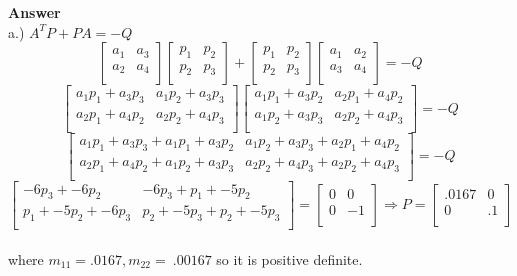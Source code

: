 \documentclass{homeworg}
\newcommand{\transpose}[1]{\ensuremath{#1^{\scriptscriptstyle T}}}
\begin{document}
\noindent
\textbf{Answer} \\
a.) \(\transpose{A}P+PA=-Q \)
\begin{equation*}
\begin{bmatrix}
    a_1 & a_3\\
    a_2 & a_4\\
\end{bmatrix}
\begin{bmatrix}
  p_1 & p_2\\
  p_2 & p_3\\
\end{bmatrix} +
\begin{bmatrix}
p_1 & p_2\\
p_2 & p_3\\
\end{bmatrix}
\begin{bmatrix}
  a_1 & a_2\\
  a_3 & a_4\\
\end{bmatrix} = -Q
\end{equation*}
\begin{equation*}
\begin{bmatrix}
  a_1 p_1 + a_3 p_3 & a_1 p_2 + a_3 p_3 \\
  a_2 p_1 + a_4 p_2 & a_2 p_2 + a_4 p_3 \\
\end{bmatrix}
\begin{bmatrix}
  a_1 p_1 + a_3 p_2 & a_2 p_1 + a_4 p_2 \\
  a_1 p_2 + a_3 p_3 & a_2 p_2 + a_4 p_3 \\
\end{bmatrix} = -Q
\end{equation*}
\begin{equation*}
  \begin{bmatrix}
    a_1 p_1 + a_3 p_3 + a_1 p_1 + a_3 p_2 & a_1 p_2 + a_3 p_3 + a_2 p_1 + a_4 p_2\\
    a_2 p_1 + a_4 p_2 + a_1 p_2 + a_3 p_3 & a_2 p_2 + a_4 p_3 + a_2 p_2 + a_4 p_3\\
  \end{bmatrix} = -Q
\end{equation*}
\begin{equation*}
\begin{bmatrix}
    -6 p_3 + -6 p_2 & -6 p_3 + p_1 + -5 p_2\\
    p_1 + -5 p_2 + -6 p_3 & p_2 + -5 p_3 + p_2 + -5 p_3\\
\end{bmatrix} =
\begin{bmatrix}
  0 & 0\\
  0 & -1\\
\end{bmatrix} \Rightarrow
P = \begin{bmatrix}
  .0167 & 0\\
  0 & .1\\
\end{bmatrix}
\end{equation*}\\
where \(m_{11}= .0167, m_{22}= ~.00167\) so it is positive definite.\\
\end{document}
